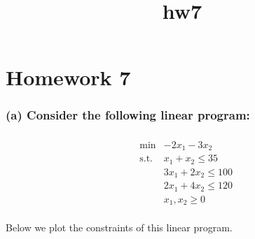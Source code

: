 \documentclass[11pt]{article}
\title{hw7}
\begin{document}
    
    
    \maketitle
    
    

    
    \hypertarget{homework-7}{%
\section{Homework 7}\label{homework-7}}

    \hypertarget{a-consider-the-following-linear-program}{%
\subsubsection{(a) Consider the following linear
program:}\label{a-consider-the-following-linear-program}}

\begin{align} \\
&\text{min} & -2x_1 - 3x_2 \\
&\text{s.t.} & x_1 + x_2 \le 35 \\ 
&& 3x_1 + 2x_2 \le 100 \\
&& 2x_1 + 4x_2 \le 120 \\
&& x_1, x_2 \ge 0 \\
\end{align}

Below we plot the constraints of this linear program.
\end{document}
